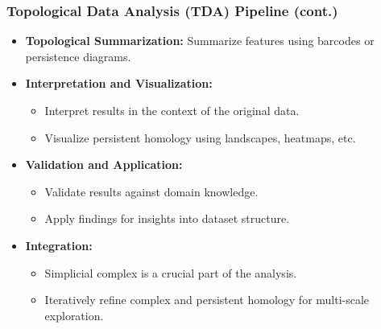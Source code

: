 \documentclass{beamer}
\begin{document}
\begin{frame}
  \frametitle{Topological Data Analysis (TDA) Pipeline (cont.)}

  \begin{itemize}
    \setlength\itemsep{1em}
    \item \textbf{Topological Summarization:} Summarize features using barcodes or persistence diagrams.
    \item \textbf{Interpretation and Visualization:}
      \begin{itemize}
        \setlength\itemsep{0.5em}
        \item Interpret results in the context of the original data.
        \item Visualize persistent homology using landscapes, heatmaps, etc.
      \end{itemize}
    \item \textbf{Validation and Application:}
      \begin{itemize}
        \setlength\itemsep{0.5em}
        \item Validate results against domain knowledge.
        \item Apply findings for insights into dataset structure.
      \end{itemize}
    \item \textbf{Integration:}
      \begin{itemize}
        \setlength\itemsep{0.5em}
        \item Simplicial complex is a crucial part of the analysis.
        \item Iteratively refine complex and persistent homology for multi-scale exploration.
      \end{itemize}
  \end{itemize}
\end{frame}
\end{document}
